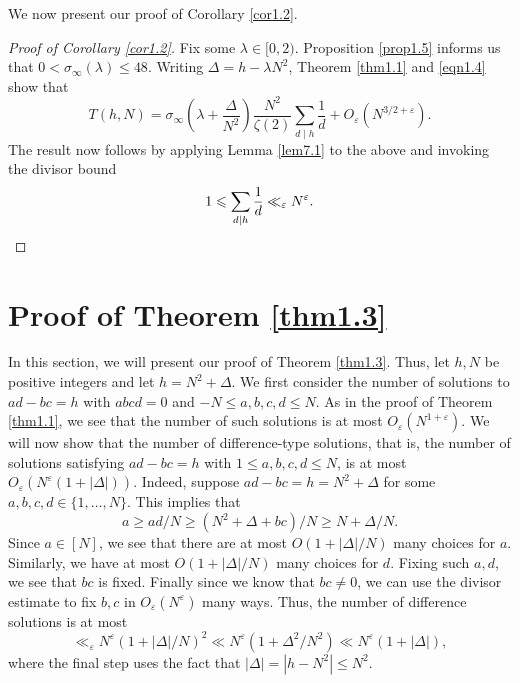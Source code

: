 \documentclass[12pt,reqno]{amsart}
\theoremstyle{definition}
\theoremstyle{remark}
\numberwithin{equation}{section}
\renewcommand{\geq}{\geqslant}
\renewcommand{\leq}{\leqslant}
\def\eps{\varepsilon}
\newcommand\1{\mathds{1}}
\begin{document}
We now present our proof of Corollary \ref{cor1.2}.

 \begin{proof}[Proof of Corollary \ref{cor1.2}]
     Fix some $\lambda\in[0,2)$. Proposition \ref{prop1.5} informs us that $0<\sigma_\infty(\lambda)\leqslant 48$. Writing $\Delta = h -\lambda N^2$, Theorem \ref{thm1.1} and \eqref{eqn1.4} show that
     \begin{equation*}
         T(h,N) = \sigma_{\infty}\left(\lambda + \frac{\Delta}{N^2}\right)\frac{N^2}{\zeta(2)}\sum_{d\mid h}\frac{1}{d} + O_{\eps}(N^{3/2 + \eps}).
     \end{equation*}
     The result now follows by applying Lemma \ref{lem7.1} to the above and invoking the divisor bound
     \begin{equation*}
         1\leqslant \sum_{d\mid h}\frac{1}{d}\ll_\eps N^\eps.\qedhere
     \end{equation*}
 \end{proof}

\section{Proof of Theorem \ref{thm1.3}}\label{sec8}


 In this section, we will present our proof of Theorem \ref{thm1.3}. Thus, let $h,N$ be positive integers and let $h = N^2 + \Delta$. We first consider the number of solutions to $ad - bc = h$ with $abcd = 0$ and $-N \leq a,b,c,d \leq N$. As in the proof of Theorem \ref{thm1.1}, we see that the number of such solutions is at most $O_{\eps}(N^{1 + \eps})$.  We will now show that the number of difference-type solutions, that is, the number of solutions satisfying $ad - bc = h$ with $1 \leq a,b,c,d \leq N$, is at most $O_{\eps}(N^{\eps}( 1 + |\Delta|)).$ Indeed,  suppose $ad - bc = h = N^2 + \Delta$ for some $a,b,c,d \in \{1,\dots, N\}$. This implies that 
 \[ a \geq ad/N \geq (N^2 + \Delta + bc)/N \geq N + \Delta/N. \]
 Since $a \in [N]$, we see that there are at most $O(1 + |\Delta|/N)$ many choices for $a$. Similarly, we have at most $O(1 + |\Delta|/N)$ many choices for $d$. Fixing such $a,d$, we see that $bc$ is fixed. Finally since we know that $bc \neq 0$, we can use the divisor estimate to fix $b,c$ in $O_{\eps}(N^{\eps})$ many ways. Thus, the number of difference solutions is at most
 \[ \ll_{\eps} N^{\eps} ( 1 + |\Delta|/N)^2 \ll N^{\eps} (1 + \Delta^2/N^2) \ll N^{\eps} (1 + |\Delta|), \]
 where the final step uses the fact that $|\Delta| = |h - N^2| \leq N^2$. 
\end{document}
